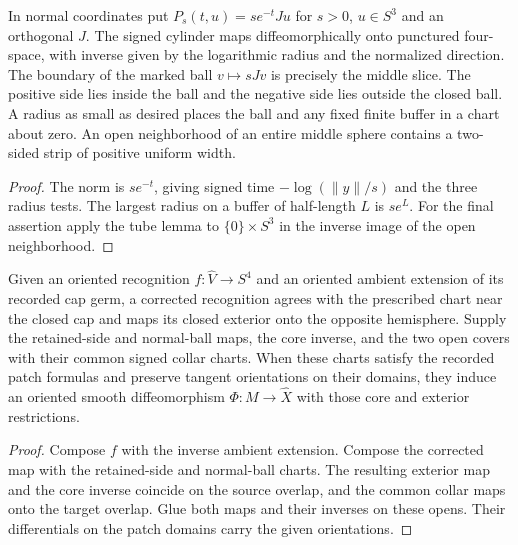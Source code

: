\begin{lemma}
\label{lem:cut-normal-mark}
\leanok
In normal coordinates put $P_s(t,u)=se^{-t}Ju$ for $s>0$, $u\in S^3$
and an orthogonal $J$. The signed cylinder maps diffeomorphically onto punctured four-space,
with inverse given by the logarithmic radius and the normalized direction. The boundary of the marked ball $v\mapsto sJv$
is precisely the middle slice. The positive side lies inside the ball
and the negative side lies outside the closed ball. A radius as small
as desired places the ball and any fixed finite buffer in a chart
about zero. An open neighborhood of an entire middle sphere contains
a two-sided strip of positive uniform width.
\end{lemma}
\begin{proof}
\leanok
The norm is $se^{-t}$, giving signed time $-\log(\|y\|/s)$ and the
three radius tests. The largest radius on a buffer of half-length
$L$ is $se^L$. For the final assertion apply the tube lemma to
$\{0\}\times S^3$ in the inverse image of the open neighborhood.
\end{proof}

\begin{proposition}
\label{prop:cut-marked-reassembly}
\leanok
Given an oriented recognition $f:\widehat V\to S^4$ and an oriented
ambient extension of its recorded cap germ, a corrected recognition
agrees with the prescribed chart near the closed cap and maps its closed
exterior onto the opposite hemisphere. Supply the retained-side and
normal-ball maps, the core inverse, and the two open covers with their
common signed collar charts. When these charts satisfy the recorded
patch formulas and preserve tangent orientations on their domains, they
induce an oriented smooth diffeomorphism $\Phi:M\to\widehat X$
with those core and exterior restrictions.
\end{proposition}
\begin{proof}
\leanok
Compose $f$ with the inverse ambient extension. Compose the corrected
map with the retained-side and normal-ball charts. The resulting
exterior map and the core inverse coincide on the source overlap, and
the common collar maps onto the target overlap. Glue both maps and
their inverses on these opens. Their differentials on the patch domains
carry the given orientations.
\end{proof}

